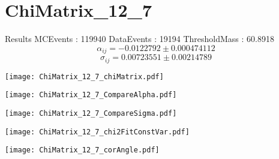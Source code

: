 \documentclass[a4paper,12pt]{article}
\begin{document}
\section{ChiMatrix\_12\_7}
\begin{minipage}{0.49\linewidth} Results \newline
MCEvents : 119940\newline
DataEvents : 19194 \newline
ThresholdMass : 60.8918\\
$$\alpha_{ij} = -0.0122792\pm 0.000474112$$
$$\sigma_{ij} = 0.00723551\pm 0.00214789$$
\end{minipage}\hfill
\begin{minipage}{0.49\linewidth} 
\texttt{[image: ChiMatrix\_12\_7\_chiMatrix.pdf]}\\
\end{minipage}
\hfill
\begin{minipage}{0.49\linewidth} 
\texttt{[image: ChiMatrix\_12\_7\_CompareAlpha.pdf]}\\
\end{minipage}
\hfill
\begin{minipage}{0.49\linewidth} 
\texttt{[image: ChiMatrix\_12\_7\_CompareSigma.pdf]}\\
\end{minipage}
\begin{minipage}{0.49\linewidth} 
\texttt{[image: ChiMatrix\_12\_7\_chi2FitConstVar.pdf]}\\
\end{minipage}
\hfill
\begin{minipage}{0.49\linewidth} 
\texttt{[image: ChiMatrix\_12\_7\_corAngle.pdf]}\\
\end{minipage}
\end{document}
